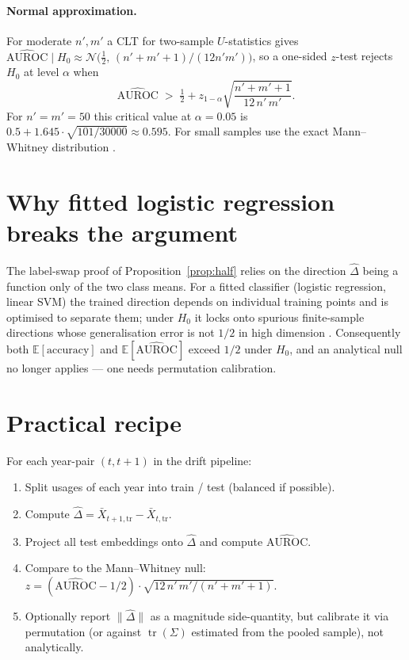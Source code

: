 \documentclass[11pt]{article}
\newcommand{\E}{\mathbb{E}}
\newcommand{\tr}{\operatorname{tr}}
\newcommand{\1}{\mathbf{1}}
\begin{document}
\paragraph{Normal approximation.}
For moderate $n', m'$ a CLT for two-sample $U$-statistics gives
$\widehat{\mathrm{AUROC}} \mid H_0 \approx
\mathcal{N}\!\bigl(\tfrac{1}{2},\,(n'+m'+1)/(12 n' m')\bigr)$, so a
one-sided $z$-test rejects $H_0$ at level $\alpha$ when
\[
  \widehat{\mathrm{AUROC}} \;>\; \tfrac{1}{2}
   + z_{1-\alpha}\sqrt{\frac{n'+m'+1}{12\,n'\,m'}}.
\]
For $n' = m' = 50$ this critical value at $\alpha = 0.05$ is
$0.5 + 1.645 \cdot \sqrt{101/30000} \approx 0.595$. For small samples
use the exact Mann--Whitney distribution \cite{HollanderWolfeChicken2014}.

\section{Why fitted logistic regression breaks the argument}

The label-swap proof of Proposition~\ref{prop:half} relies on the
direction $\hat\Delta$ being a function only of the two class means.
For a fitted classifier (logistic regression, linear SVM) the trained
direction depends on individual training points and is optimised to
separate them; under $H_0$ it locks onto spurious finite-sample
directions whose generalisation error is not $1/2$ in high dimension
\cite{BickelLevina2004}. Consequently both $\E[\mathrm{accuracy}]$ and
$\E[\widehat{\mathrm{AUROC}}]$ exceed $1/2$ under $H_0$, and an
analytical null no longer applies --- one needs permutation calibration.

\section{Practical recipe}

For each year-pair $(t, t+1)$ in the drift pipeline:
\begin{enumerate}
  \item Split usages of each year into train / test (balanced if possible).
  \item Compute $\hat\Delta = \bar X_{t+1,\mathrm{tr}} - \bar X_{t,\mathrm{tr}}$.
  \item Project all test embeddings onto $\hat\Delta$ and compute
        $\widehat{\mathrm{AUROC}}$.
  \item Compare to the Mann--Whitney null:
        $z = (\widehat{\mathrm{AUROC}} - 1/2) \cdot
              \sqrt{12\,n'\,m'/(n'+m'+1)}$.
  \item Optionally report $\|\hat\Delta\|$ as a magnitude side-quantity,
        but calibrate it via permutation (or against $\tr(\Sigma)$
        estimated from the pooled sample), not analytically.
\end{enumerate}
\end{document}
